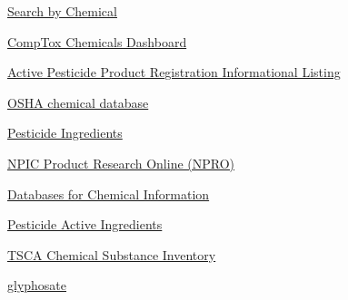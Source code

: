 \documentclass[
  letterpaper,
  DIV=11,
  numbers=noendperiod]{scrartcl}
\begin{document}
\href{https://ordspub.epa.gov/ords/pesticides/f?p=113:17::::::}{Search
by Chemical}

\href{https://comptox.epa.gov/dashboard/}{CompTox Chemicals Dashboard}

\href{https://ordspub.epa.gov/ords/pesticides/f?p=APPRIL_PUBLIC:2::::::}{Active
Pesticide Product Registration Informational Listing}

\href{https://www.osha.gov/chemicaldata}{OSHA chemical database}

\href{http://npic.orst.edu/ingred/}{Pesticide Ingredients}

\href{http://npic.orst.edu/NPRO/}{NPIC Product Research Online (NPRO)}

\href{http://npic.orst.edu/ingred/cheminfo.html}{Databases for Chemical
Information}

\href{http://npic.orst.edu/ingred/active.html}{Pesticide Active
Ingredients}

\href{https://www.epa.gov/tsca-inventory}{TSCA Chemical Substance
Inventory}

\href{https://ordspub.epa.gov/ords/pesticides/f?p=CHEMICALSEARCH:3::::1,3,31,7,12,25:P3_XCHEMICAL_ID:2478}{glyphosate}
\end{document}
